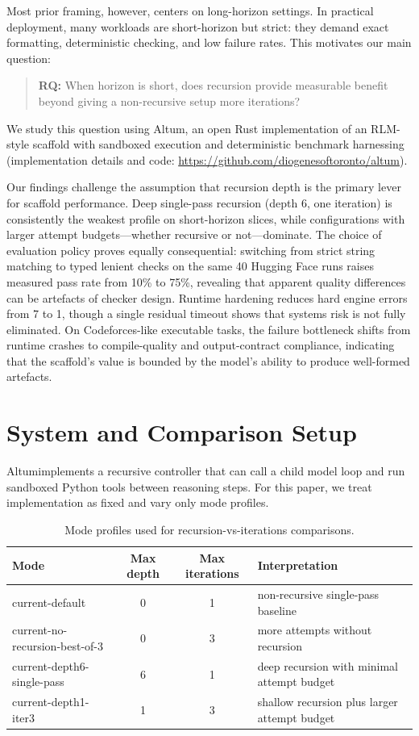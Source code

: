 \documentclass[11pt]{article}
\newcommand{\altum}{Altum}
\newcommand{\rlm}{RLM}
\begin{document}
Most prior framing, however, centers on long-horizon settings. In practical deployment, many workloads are short-horizon but strict: they demand exact formatting, deterministic checking, and low failure rates. This motivates our main question:

\begin{quote}
\textbf{RQ:} When horizon is short, does recursion provide measurable benefit beyond giving a non-recursive setup more iterations?
\end{quote}

We study this question using \altum, an open Rust implementation of an \rlm-style scaffold with sandboxed execution and deterministic benchmark harnessing (implementation details and code: \url{https://github.com/diogenesoftoronto/altum}).

Our findings challenge the assumption that recursion depth is the primary lever for scaffold performance. Deep single-pass recursion (depth 6, one iteration) is consistently the weakest profile on short-horizon slices, while configurations with larger attempt budgets---whether recursive or not---dominate. The choice of evaluation policy proves equally consequential: switching from strict string matching to typed lenient checks on the same 40 Hugging Face runs raises measured pass rate from 10\% to 75\%, revealing that apparent quality differences can be artefacts of checker design. Runtime hardening reduces hard engine errors from 7 to 1, though a single residual timeout shows that systems risk is not fully eliminated. On Codeforces-like executable tasks, the failure bottleneck shifts from runtime crashes to compile-quality and output-contract compliance, indicating that the scaffold's value is bounded by the model's ability to produce well-formed artefacts.

\section{System and Comparison Setup}
\altum implements a recursive controller that can call a child model loop and run sandboxed Python tools between reasoning steps. For this paper, we treat implementation as fixed and vary only mode profiles.

\begin{table}[h]
\centering
\caption{Mode profiles used for recursion-vs-iterations comparisons.}
\label{tab:modes}
\begin{tabular}{lccp{6.4cm}}
\toprule
Mode & Max depth & Max iterations & Interpretation \\
\midrule
current-default & 0 & 1 & non-recursive single-pass baseline \\
current-no-recursion-best-of-3 & 0 & 3 & more attempts without recursion \\
current-depth6-single-pass & 6 & 1 & deep recursion with minimal attempt budget \\
current-depth1-iter3 & 1 & 3 & shallow recursion plus larger attempt budget \\
\bottomrule
\end{tabular}
\end{table}
\end{document}
